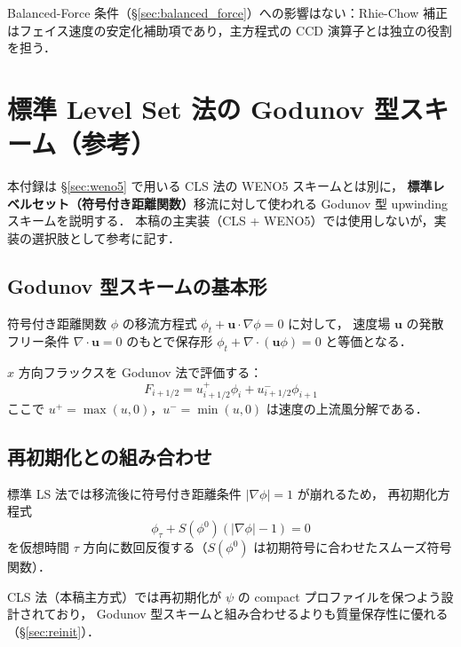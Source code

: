 Balanced-Force 条件（§\ref{sec:balanced_force}）への影響はない：Rhie-Chow 補正はフェイス速度の安定化補助項であり，主方程式の CCD 演算子とは独立の役割を担う．

\section{標準 Level Set 法の Godunov 型スキーム（参考）}
\label{app:godunov_ls}

本付録は §\ref{sec:weno5} で用いる CLS 法の WENO5 スキームとは別に，
\textbf{標準レベルセット（符号付き距離関数）}移流に対して使われる Godunov 型 upwinding スキームを説明する．
本稿の主実装（CLS + WENO5）では使用しないが，実装の選択肢として参考に記す．

\subsection{Godunov 型スキームの基本形}

符号付き距離関数 $\phi$ の移流方程式 $\phi_t + \bm{u}\cdot\nabla\phi = 0$ に対して，
速度場 $\bm{u}$ の発散フリー条件 $\nabla\cdot\bm{u}=0$ のもとで保存形 $\phi_t + \nabla\cdot(\bm{u}\phi) = 0$ と等価となる．

$x$ 方向フラックスを Godunov 法で評価する：
\begin{equation}
  F_{i+1/2} = u_{i+1/2}^+ \phi_i + u_{i+1/2}^- \phi_{i+1}
\end{equation}
ここで $u^+ = \max(u, 0)$，$u^- = \min(u, 0)$ は速度の上流風分解である．

\subsection{再初期化との組み合わせ}

標準 LS 法では移流後に符号付き距離条件 $|\nabla\phi| = 1$ が崩れるため，
再初期化方程式
\[
  \phi_\tau + S(\phi^0)(|\nabla\phi|-1) = 0
\]
を仮想時間 $\tau$ 方向に数回反復する（$S(\phi^0)$ は初期符号に合わせたスムーズ符号関数）．

CLS 法（本稿主方式）では再初期化が $\psi$ の compact プロファイルを保つよう設計されており，
Godunov 型スキームと組み合わせるよりも質量保存性に優れる（§\ref{sec:reinit}）．
